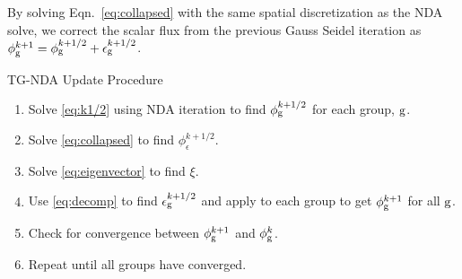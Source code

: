   By solving Eqn.~\eqref{eq:collapsed} with the same spatial discretization as the NDA solve, we correct the scalar flux from the previous Gauss Seidel iteration as $\phi_{\mathrm{g}}^{k+1} = \phi_{\mathrm{g}}^{k+1/2} + \epsilon_{\mathrm{g}}^{k+1/2}$.

  TG-NDA Update Procedure
  \begin{enumerate}
      \item Solve \eqref{eq:k1/2} using NDA iteration to find $\phi_{\mathrm{g}}^{k+1/2}$ for each group, $\mathrm{g}$. 
      \item Solve \eqref{eq:collapsed} to find $\phi_\epsilon^{k+1/2}$. 
      \item Solve \eqref{eq:eigenvector} to find $\xi$. 
      \item Use \eqref{eq:decomp} to find $\epsilon_{\mathrm{g}}^{k+1/2}$ and apply to each group to get $\phi_{\mathrm{g}}^{k+1}$ for all $\mathrm{g}$. 
      \item Check for convergence between $\phi_{\mathrm{g}}^{k+1}$ and $\phi_{\mathrm{g}}^{k}$.
      \item Repeat until all groups have converged.
  \end{enumerate}
